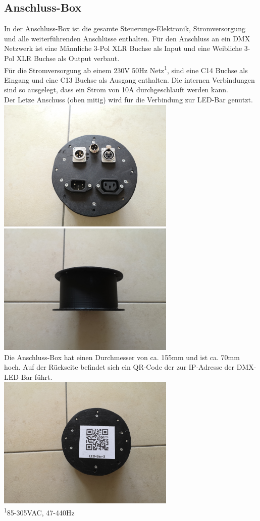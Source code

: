 \documentclass{article}
\begin{document}
\subsection{Anschluss-Box}
In der Anschluss-Box ist die gesamte Steuerungs-Elektronik, Stromversorgung und alle weiterführenden Anschlüsse enthalten. Für den Anschluss an ein DMX Netzwerk ist eine Männliche 3-Pol XLR Buchse als Input und eine Weibliche 3-Pol XLR Buchse als Output verbaut.\\
Für die Stromversorgung ab einem 230V 50Hz Netz\textsuperscript{1}, sind eine C14 Buchse als Eingang und eine C13 Buchse als Ausgang enthalten. Die internen Verbindungen sind so ausgelegt, dass ein Strom von 10A durchgeschlauft werden kann.\\
Der Letze Anschuss (oben mitig) wird für die Verbindung zur LED-Bar genutzt.\\
\includegraphics[width = 8.5cm]{Con-Box_front}
\includegraphics[width = 8.5cm]{Con-Box_side}\\
Die Anschluss-Box hat einen Durchmesser von ca. 155mm und ist ca. 70mm hoch. Auf der Rückseite befindet sich ein QR-Code der zur IP-Adresse der DMX-LED-Bar führt. \\
\includegraphics[width = 8.5cm]{Con-Box_back}\\
\textsuperscript{1}85-305VAC, 47-440Hz
\newpage
\end{document}
